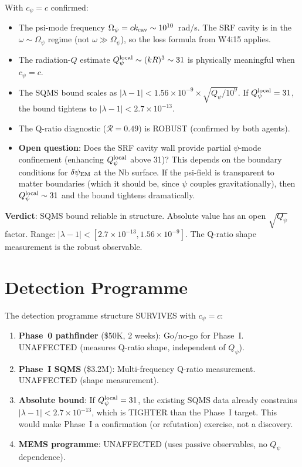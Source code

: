 \documentclass[11pt]{article}
\newcommand{\ee}[1]{\times 10^{#1}}
\newcommand{\dpsiEM}{\delta\psi_{\rm EM}}
\newcommand{\lbone}{|\lambda - 1|}
\newcommand{\Qpsi}{Q_\psi}
\newcommand{\Opsi}{\Omega_\psi}
\begin{document}
With $c_\psi = c$ confirmed:
\begin{itemize}
\item The psi-mode frequency $\Opsi = c k_{\rm cav} \sim 10^{10}$~rad/s.
  The SRF cavity is in the $\omega \sim \Opsi$ regime (not $\omega \gg
  \Opsi$), so the loss formula from W4i15 applies.
\item The radiation-$Q$ estimate $\Qpsi^{\rm local} \sim (kR)^3 \sim 31$
  is physically meaningful when $c_\psi = c$.
\item The SQMS bound scales as $\lbone < 1.56\ee{-9} \times
  \sqrt{\Qpsi/10^9}$. If $\Qpsi^{\rm local} = 31$, the bound
  tightens to $\lbone < 2.7\ee{-13}$.
\item The Q-ratio diagnostic ($\mathcal{R} = 0.49$) is ROBUST
  (confirmed by both agents).
\item \textbf{Open question}: Does the SRF cavity wall provide
  partial $\psi$-mode confinement (enhancing $\Qpsi^{\rm local}$
  above 31)? This depends on the boundary conditions for $\dpsiEM$
  at the Nb surface. If the psi-field is transparent to matter
  boundaries (which it should be, since $\psi$ couples gravitationally),
  then $\Qpsi^{\rm local} \sim 31$ and the bound tightens dramatically.
\end{itemize}

\textbf{Verdict}: SQMS bound reliable in structure. Absolute value
has an open $\sqrt{\Qpsi}$ factor. Range: $\lbone < [2.7\ee{-13},
1.56\ee{-9}]$. The Q-ratio shape measurement is the robust observable.


\section{Detection Programme}

The detection programme structure SURVIVES with $c_\psi = c$:
\begin{enumerate}
\item \textbf{Phase~0 pathfinder} (\$50K, 2 weeks): Go/no-go for
  Phase~I. UNAFFECTED (measures Q-ratio shape, independent of $\Qpsi$).
\item \textbf{Phase~I SQMS} (\$3.2M): Multi-frequency Q-ratio
  measurement. UNAFFECTED (shape measurement).
\item \textbf{Absolute bound}: If $\Qpsi^{\rm local} = 31$, the
  existing SQMS data already constrains $\lbone < 2.7\ee{-13}$,
  which is TIGHTER than the Phase~I target. This would make Phase~I
  a confirmation (or refutation) exercise, not a discovery.
\item \textbf{MEMS programme}: UNAFFECTED (uses passive observables,
  no $\Qpsi$ dependence).
\end{enumerate}
\end{document}
